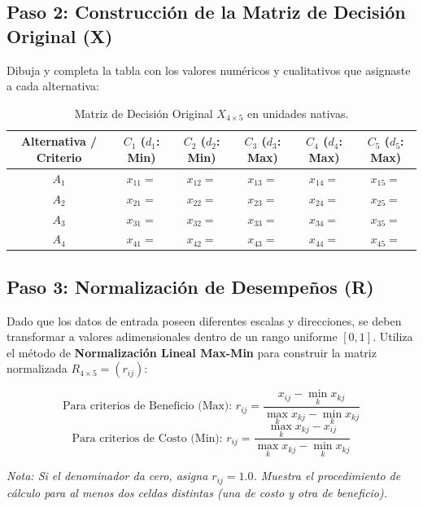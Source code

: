 \documentclass[11pt,a4paper]{article}
\begin{document}
\subsection{Paso 2: Construcción de la Matriz de Decisión Original (X)}
Dibuja y completa la tabla con los valores numéricos y cualitativos que asignaste a cada alternativa:
\begin{table}[h!]
  \centering
  \scriptsize
  \begin{tabular}{|c|c|c|c|c|c|}
    \hline
    \textbf{Alternativa / Criterio} & \textbf{$C_1$ ($d_1$: Min)} & \textbf{$C_2$ ($d_2$: Min)} & \textbf{$C_3$ ($d_3$: Max)} & \textbf{$C_4$ ($d_4$: Max)} & \textbf{$C_5$ ($d_5$: Max)} \\ \hline
    $A_1$ & $x_{11} = $ & $x_{12} = $ & $x_{13} = $ & $x_{14} = $ & $x_{15} = $ \\ \hline
    $A_2$ & $x_{21} = $ & $x_{22} = $ & $x_{23} = $ & $x_{24} = $ & $x_{25} = $ \\ \hline
    $A_3$ & $x_{31} = $ & $x_{32} = $ & $x_{33} = $ & $x_{34} = $ & $x_{35} = $ \\ \hline
    $A_4$ & $x_{41} = $ & $x_{42} = $ & $x_{43} = $ & $x_{44} = $ & $x_{45} = $ \\ \hline
  \end{tabular}
  \caption{Matriz de Decisión Original $X_{4 \times 5}$ en unidades nativas.}
\end{table}

\newpage

\subsection{Paso 3: Normalización de Desempeños (R)}
Dado que los datos de entrada poseen diferentes escalas y direcciones, se deben transformar a valores adimensionales dentro de un rango uniforme $[0, 1]$. Utiliza el método de \textbf{Normalización Lineal Max-Min} para construir la matriz normalizada $R_{4 \times 5} = (r_{ij})$:

\begin{equation}
  \text{Para criterios de Beneficio (Max): } r_{ij} = \frac{x_{ij} - \min_{k} x_{kj}}{\max_{k} x_{kj} - \min_{k} x_{kj}}
\end{equation}
\begin{equation}
  \text{Para criterios de Costo (Min): } r_{ij} = \frac{\max_{k} x_{kj} - x_{ij}}{\max_{k} x_{kj} - \min_{k} x_{kj}}
\end{equation}

\textit{Nota: Si el denominador da cero, asigna $r_{ij} = 1.0$. Muestra el procedimiento de cálculo para al menos dos celdas distintas (una de costo y otra de beneficio).}
\end{document}
